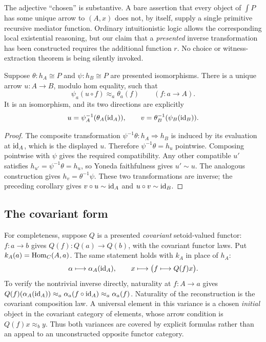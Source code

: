 The adjective ``chosen'' is substantive.  A bare assertion that every object
of $\int P$ has some unique arrow to $(A,x)$ does not, by itself, supply a
single primitive recursive mediator function.  Ordinary intuitionistic logic
allows the corresponding local existential reasoning, but our claim that a
\emph{presented} inverse transformation has been constructed requires the
additional function $r$.  No choice or witness-extraction theorem is being
silently invoked.

\begin{theorem}
Suppose $\theta:h_A\cong P$ and $\psi:h_B\cong P$ are presented
isomorphisms.  There is a unique arrow $u:A\to B$, modulo hom equality,
such that
\[
 \psi_a(u\circ f)\approx_a\theta_a(f)
 \qquad(f:a\to A).
\]
It is an isomorphism, and its two directions are explicitly
\[
 u=\psi_A^{-1}(\theta_A(\operatorname{id}_A)),\qquad
 v=\theta_B^{-1}(\psi_B(\operatorname{id}_B)).
\]
\end{theorem}
\begin{proof}
The composite transformation $\psi^{-1}\theta:h_A\Rightarrow h_B$ is
induced by its evaluation at $\operatorname{id}_A$, which is the displayed $u$.
Therefore $\psi^{-1}\theta=h_u$ pointwise.  Composing pointwise with $\psi$
gives the required compatibility.  Any other compatible $u'$ satisfies
$h_{u'}=\psi^{-1}\theta=h_u$, so Yoneda faithfulness gives $u'\sim u$.
The analogous construction gives $h_v=\theta^{-1}\psi$.  These two
transformations are inverse; the preceding corollary gives
$v\circ u\sim\operatorname{id}_A$ and $u\circ v\sim\operatorname{id}_B$.
\end{proof}

\subsection{The covariant form}

For completeness, suppose $Q$ is a presented \emph{covariant} setoid-valued
functor: $f:a\to b$ gives $Q(f):Q(a)\to Q(b)$, with the covariant functor
laws.  Put $k_A(a)=\operatorname{Hom}_C(A,a)$.  The same statement holds with
$k_A$ in place of $h_A$:
\[
 \alpha\longmapsto\alpha_A(\operatorname{id}_A),\qquad
 x\longmapsto\bigl(f\longmapsto Q(f)x\bigr).
\]
To verify the nontrivial inverse directly, naturality at $f:A\to a$ gives
$Q(f)(\alpha_A(\operatorname{id}_A))\approx_a\alpha_a(f\circ\operatorname{id}_A)
\approx_a\alpha_a(f)$.  Naturality of the reconstruction is the covariant
composition law.  A universal element in this variance is a chosen
\emph{initial} object in the covariant category of elements, whose arrow
condition is $Q(f)x\approx_b y$.  Thus both variances are covered by explicit
formulas rather than an appeal to an unconstructed opposite functor category.

